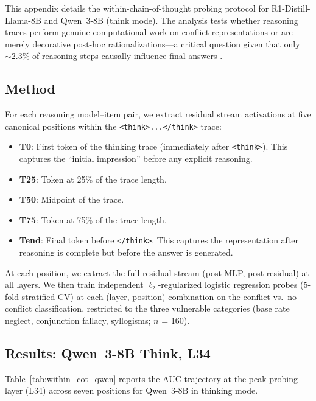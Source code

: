 \documentclass{article}
\begin{document}
This appendix details the within-chain-of-thought probing protocol
for R1-Distill-Llama-8B and Qwen~3-8B (think mode).  The analysis
tests whether reasoning traces perform genuine computational work
on conflict representations or are merely decorative post-hoc
rationalizations---a critical question given that only ${\sim}2.3$\%
of reasoning steps causally influence final answers
\citep{jiang2025aha, lanham2023measuring}.

\subsection{Method}

For each reasoning model--item pair, we extract residual stream
activations at five canonical positions within the
\texttt{<think>...\allowbreak</think>} trace:

\begin{itemize}[leftmargin=*,itemsep=2pt]
  \item \textbf{T0}: First token of the thinking trace (immediately
  after \texttt{<think>}).  This captures the ``initial impression''
  before any explicit reasoning.
  \item \textbf{T25}: Token at 25\% of the trace length.
  \item \textbf{T50}: Midpoint of the trace.
  \item \textbf{T75}: Token at 75\% of the trace length.
  \item \textbf{Tend}: Final token before \texttt{</think>}.
  This captures the representation after reasoning is complete
  but before the answer is generated.
\end{itemize}

\noindent At each position, we extract the full residual stream
(post-MLP, post-residual) at all layers.  We then train independent
$\ell_2$-regularized logistic regression probes (5-fold stratified CV)
at each (layer, position) combination on the conflict vs.\ no-conflict
classification, restricted to the three vulnerable categories (base
rate neglect, conjunction fallacy, syllogisms; $n$ = 160).

\subsection{Results: Qwen~3-8B Think, L34}

Table~\ref{tab:within_cot_qwen} reports the AUC trajectory at the
peak probing layer (L34) across seven positions for Qwen~3-8B in
thinking mode.
\end{document}
